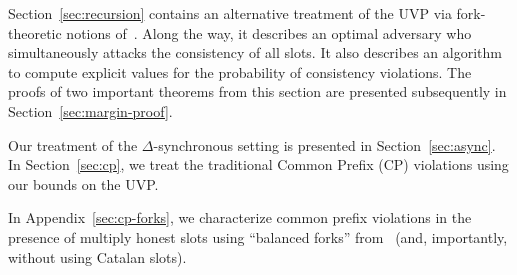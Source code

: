 Section~\ref{sec:recursion} contains an alternative treatment 
of the UVP via fork-theoretic notions of~\cite{LinearConsistency}. 
Along the way, it describes an optimal adversary who simultaneously attacks the consistency of all slots. 
It also describes an algorithm to compute explicit values 
for the probability of consistency violations. 
The proofs of two important theorems from this section 
are presented subsequently in Section~\ref{sec:margin-proof}.


Our treatment of the $\Delta$-synchronous setting is
presented in Section~\ref{sec:async}.  In Section~\ref{sec:cp}, we
treat the traditional Common Prefix (CP) violations using our bounds
on the UVP.  

In Appendix~\ref{sec:cp-forks}, 
we characterize common prefix violations 
in the presence of multiply honest slots 
using ``balanced forks'' from~\cite{LinearConsistency} (and, importantly, 
without using Catalan slots).



